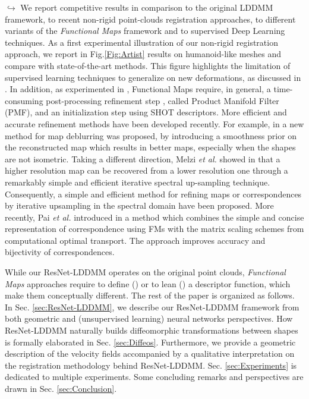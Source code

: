 $\hookrightarrow$ We report competitive results in comparison to the original LDDMM framework, to recent non-rigid point-clouds registration approaches, to different variants of the \textit{Functional Maps} framework and to supervised Deep Learning techniques. As a first experimental illustration of our non-rigid registration approach, we report in Fig.\ref{Fig:Artist} results on humanoid-like meshes and compare with state-of-the-art methods. This figure highlights the limitation of supervised learning techniques \cite{litany2017deep} to generalize on new deformations, as discussed in \cite{halimi2019unsupervised}. In addition, as experimented in \cite{halimi2019unsupervised}, Functional Maps require, in general, a time-consuming post-processing refinement step \cite{vestner2017efficient}, called Product Manifold Filter (PMF), and an initialization step using SHOT descriptors. More efficient and accurate refinement methods have been developed recently. For example, in \cite{ezuz2017deblurring} a new method for map deblurring was proposed, by introducing a smoothness prior on the reconstructed map which results in better maps, especially when the shapes are not isometric. Taking a different direction, Melzi \textit{et al.} showed in \cite{melzi2019zoomout} that a higher resolution map can be recovered from a lower resolution one through a remarkably simple and efficient iterative spectral up-sampling technique. Consequently, a simple and efficient method for refining maps or correspondences by iterative upsampling in the spectral domain have been proposed. More recently, Pai \textit{et al.} introduced in \cite{pai2021fast} a method which combines the simple and concise representation of correspondence using FMs with the matrix scaling schemes from computational optimal transport. The approach improves accuracy and bijectivity of correspondences.

While our ResNet-LDDMM operates on the original point clouds, \textit{Functional Maps} approaches require to define (\eg \cite{halimi2019unsupervised}) or to lean (\eg \cite{litany2017deep}) a descriptor function, which make them conceptually different. The rest of the paper is organized as follows. In Sec. \ref{sec:ResNet-LDDMM}, we describe our ResNet-LDDMM framework from both geometric and (unsupervised learning) neural networks perspectives. How ResNet-LDDMM naturally builds diffeomorphic transformations between shapes is formally elaborated in Sec. \ref{sec:Diffeos}. Furthermore, we provide a geometric description of the velocity fields accompanied by a qualitative interpretation on the registration methodology behind ResNet-LDDMM. Sec. \ref{sec:Experiments} is dedicated to multiple experiments. Some concluding remarks and perspectives are drawn in Sec. \ref{sec:Conclusion}.

